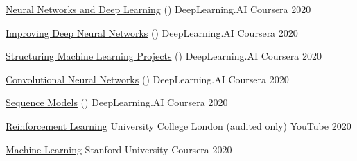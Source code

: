 \begin{cvhonors}
  \cvhonor
    {\href{https://www.coursera.org/account/accomplishments/certificate/BA53EAM4SJND}{Neural Networks and Deep Learning} (\dlspec)} %
    {DeepLearning.AI} %
    {Coursera} %
    {2020} %

  \cvhonor
    {\href{https://www.coursera.org/account/accomplishments/certificate/XCAY4CJAU2JA}{Improving Deep Neural Networks} (\dlspec)} %
    {DeepLearning.AI} %
    {Coursera} %
    {2020} %

  \cvhonor
    {\href{https://www.coursera.org/account/accomplishments/certificate/PTLC7SEV8RAY}{Structuring Machine Learning Projects} (\dlspec)} %
    {DeepLearning.AI} %
    {Coursera} %
    {2020} %

  \cvhonor
    {\href{https://www.coursera.org/account/accomplishments/certificate/CZUV3ZTPK5TA}{Convolutional Neural Networks} (\dlspec)} %
    {DeepLearning.AI} %
    {Coursera} %
    {2020} %

  \cvhonor
    {\href{https://www.coursera.org/account/accomplishments/certificate/QA34L8FPDHAY}{Sequence Models} (\dlspec)} %
    {DeepLearning.AI} %
    {Coursera} %
    {2020} %


  \cvhonor
    {\href{https://www.youtube.com/watch?v=2pWv7GOvuf0&list=PLqYmG7hTraZBiG_XpjnPrSNw-1XQaM_gB}{Reinforcement Learning}} %
    {University College London (audited only)} %
    {YouTube} %
    {2020} %

  \cvhonor
    {\href{https://www.coursera.org/account/accomplishments/certificate/2XNJSGPREAQY}{Machine Learning}} %
    {Stanford University} %
    {Coursera} %
    {2020} %

\end{cvhonors}
